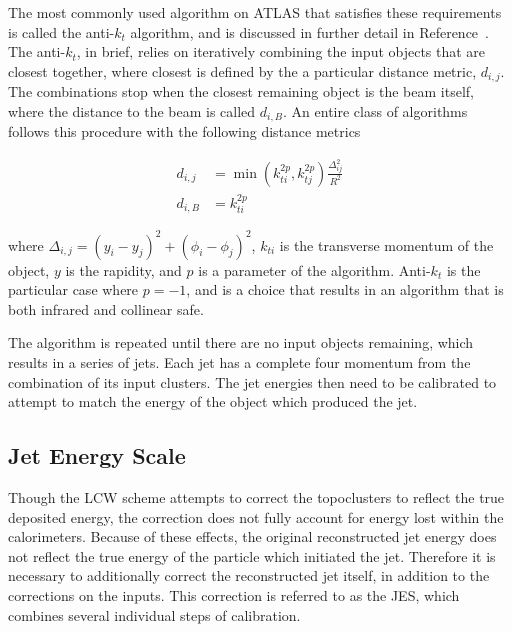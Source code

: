 The most commonly used algorithm on \ac{ATLAS} that satisfies these requirements is called the anti-$k_t$ algorithm, and is discussed in further detail in Reference~\cite{antikt}.
The anti-$k_t$, in brief, relies on iteratively combining the input objects that are closest together, where closest is defined by the a particular distance metric, $d_{i,j}$.
The combinations stop when the closest remaining object is the beam itself, where the distance to the beam is called $d_{i,B}$. 
An entire class of algorithms follows this procedure with the following distance metrics

\begin{align}\label{eq:antikt}
d_{i,j} &= \min(k_{ti}^{2p}, k_{tj}^{2p}) \frac{\Delta_{ij}^2}{R^2} \\
d_{i,B} &= k_{ti}^{2p}
\end{align}

where $\Delta_{i,j} = (y_i - y_j)^2 + (\phi_i - \phi_j)^2$, $k_{ti}$ is the transverse momentum of the object, $y$ is the rapidity, and $p$ is a parameter of the algorithm.
Anti-$k_t$ is the particular case where $p = -1$, and is a choice that results in an algorithm that is both infrared and collinear safe.

The algorithm is repeated until there are no input objects remaining, which results in a series of jets. 
Each jet has a complete four momentum from the combination of its input clusters. 
The jet energies then need to be calibrated to attempt to match the energy of the object which produced the jet.

\subsection{Jet Energy Scale}

Though the \ac{LCW} scheme attempts to correct the topoclusters to reflect the true deposited energy, the correction does not fully account for energy lost within the calorimeters.
Because of these effects, the original reconstructed jet energy does not reflect the true energy of the particle which initiated the jet.
Therefore it is necessary to additionally correct the reconstructed jet itself, in addition to the corrections on the inputs.
This correction is referred to as the \ac{JES}, which combines several individual steps of calibration.

